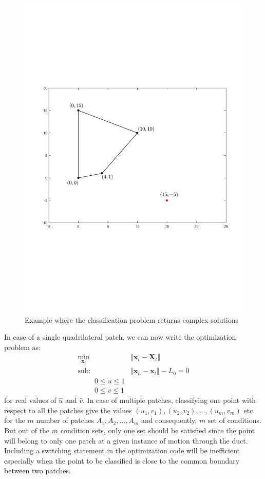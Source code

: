 \documentclass[11pt,a4paper]{article}
\begin{document}
\begin{figure}[h]
\centering
\includegraphics[scale=0.5]{figures/fig8.pdf}
\caption{Example where the classification problem returns complex solutions\label{fig:complexsolns}}
\end{figure}



 In case of a single quadrilateral patch, we can now write the optimization problem as:
 \begin{align}
 \label{eq:minx,u,v}
\min_{\textbf{x}_t} &\Vert \textbf{x}_t-\textbf{X}_t \Vert\\
\text{sub:~~~} &\Vert \textbf{x}_h - \textbf{x}_t \Vert -L_0 = 0\\
\text{~~~~~~~} 0 \leq u \leq 1\\
\text{~~~~~~~} 0 \leq v \leq 1
\end{align}
for real values of $\hat{u}$ and $\hat{v}$. In case of multiple patches, classifying one point with respect to all the patches give the values $\left({u}_1,{v}_1 \right), \left({u}_2,{v}_2 \right),...,\left({u}_m,{v}_m \right)$ etc. for the $m$ number of patches $A_1, A_2,..., A_m$ and consequently, $m$ set of conditions. But out of the $m$ condition sets, only one set should be satisfied since the point will belong to only one patch at a given instance of motion through the duct. Including a switching  statement in the optimization code will be inefficient especially when the point to be classified is close to the common boundary between two patches. 
\end{document}

